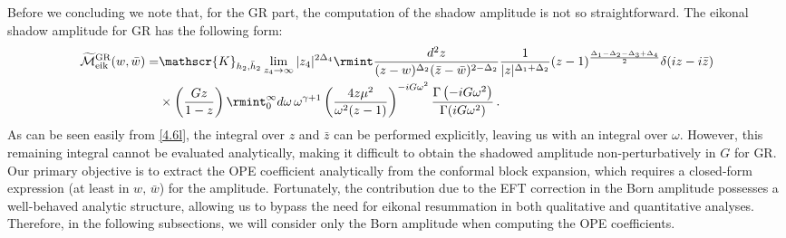Before we concluding we note that,  for the GR part, the computation of the shadow amplitude is not so straightforward. The eikonal shadow amplitude for GR has the following form:
\begin{align}
    \begin{split}
        \widetilde{\mathcal{M}}_{\textrm{eik}}^{\textrm{GR}}(w,\bar w)=&\mathscr{K}_{h_2,\bar h_2}\lim_{z_4\to \infty}|z_4|^{2\Delta_4}\rmint \frac{d^2 z}{(z-w)^{\Delta_2}(\bar z-\bar w)^{2-\Delta_2}}\frac{1}{|z|^{\Delta_1+\Delta_2}}(z-1)^{\frac{\Delta_1-\Delta_2-\Delta_3+\Delta_4}{2}}\delta(iz-i\bar z)\\ &
        \times\left(\frac{G z}{1-z}\right)\rmint_{0}^{\infty} d\omega\,\omega^{\gamma+1}\left(\frac{4 z\mu^2}{\omega^2 (z-1)}\right)^{-iG\omega^2}\frac{\Gamma\left(-iG\omega^2\right)}{\Gamma(iG\omega^2)}\,.\label{4.6l}
    \end{split}
\end{align}
As can be seen easily from \eqref{4.6l}, the integral over \( z \) and \( \bar{z} \) can be performed explicitly, leaving us with an integral over \( \omega \). However, this remaining integral cannot be evaluated analytically, making it difficult to obtain the shadowed amplitude non-perturbatively in \( G \) for GR. Our primary objective is to extract the OPE coefficient analytically from the conformal block expansion, which requires a closed-form expression (at least in $w,\,\bar w$) for the amplitude. Fortunately, the contribution due to the  EFT correction in the Born amplitude possesses a well-behaved analytic structure, allowing us to bypass the need for eikonal resummation in both qualitative and quantitative analyses. Therefore, in the following subsections, we will consider only the Born amplitude when computing the OPE coefficients.

